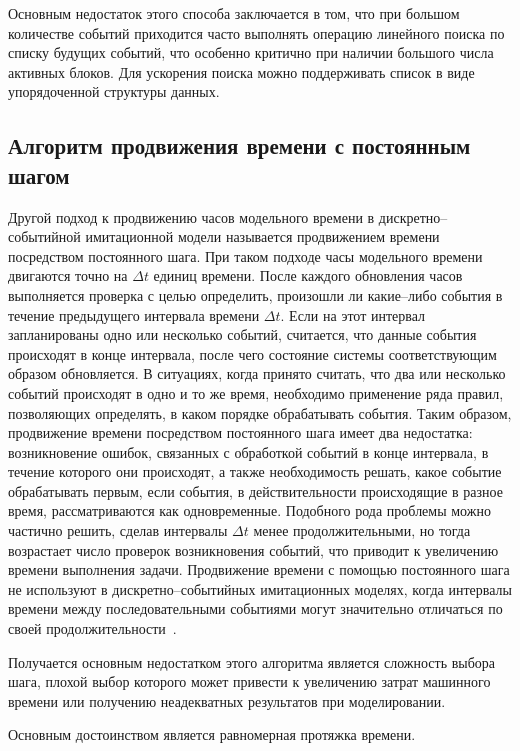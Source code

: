 Основным недостаток этого способа заключается в том, что при большом количестве событий приходится часто выполнять операцию линейного поиска по списку будущих событий, что особенно критично при наличии большого числа активных блоков. Для ускорения поиска можно поддерживать список в виде упорядоченной структуры данных.

\subsection{Алгоритм продвижения времени с постоянным шагом}

Другой подход к продвижению часов модельного времени в дискретно--событийной имитационной модели называется продвижением времени посредством постоянного шага. При таком подходе часы модельного времени двигаются точно на $\Delta t$ единиц времени. После каждого обновления часов выполняется проверка с целью определить, произошли ли какие--либо события в течение предыдущего интервала времени $\Delta t$. Если на этот интервал запланированы одно или несколько событий, считается, что данные события происходят в конце интервала, после чего состояние системы соответствующим образом обновляется. В ситуациях, когда принято считать, что два или несколько событий происходят в одно и то же время, необходимо применение ряда
правил, позволяющих определять, в каком порядке обрабатывать события. Таким образом, продвижение времени посредством постоянного шага имеет два недостатка: возникновение ошибок, связанных с обработкой событий в конце интервала, в течение которого они происходят, а также необходимость решать, какое событие обрабатывать первым, если события, в действительности происходящие в разное время, рассматриваются как одновременные. Подобного рода проблемы можно частично решить, сделав интервалы $\Delta t$ менее продолжительными, но тогда
возрастает число проверок возникновения событий, что приводит к увеличению времени выполнения задачи. Продвижение времени с помощью постоянного шага не используют в дискретно--событийных имитационных моделях, когда интервалы времени между последовательными событиями могут значительно отличаться по своей продолжительности~\cite{time_alg2}. 

Получается основным недостатком этого алгоритма является сложность выбора шага, плохой выбор которого может привести к увеличению затрат машинного времени или получению неадекватных результатов при моделировании.

Основным достоинством является равномерная протяжка времени. 

